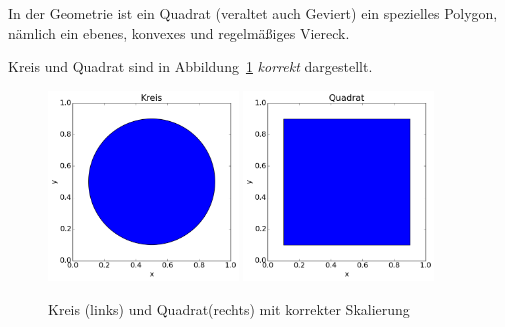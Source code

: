 \documentclass[12pt,a4paper,bibtotoc]{scrreprt}
\begin{document}
In der Geometrie ist ein Quadrat (veraltet auch Geviert) ein
spezielles Polygon, nämlich ein ebenes, konvexes und regelmäßiges
Viereck.

Kreis und Quadrat sind in Abbildung~\ref{fig:kreis_quadrat}
\emph{korrekt} dargestellt.
%
\begin{figure}[ht]
  \centering
  \includegraphics[width=0.45\textwidth]{kreis}
  \includegraphics[width=0.45\textwidth]{quadrat}
  \caption{Kreis (links) und Quadrat(rechts) mit korrekter Skalierung}
  \label{fig:kreis_quadrat}
\end{figure}
%
\printbibliography
\end{document}
